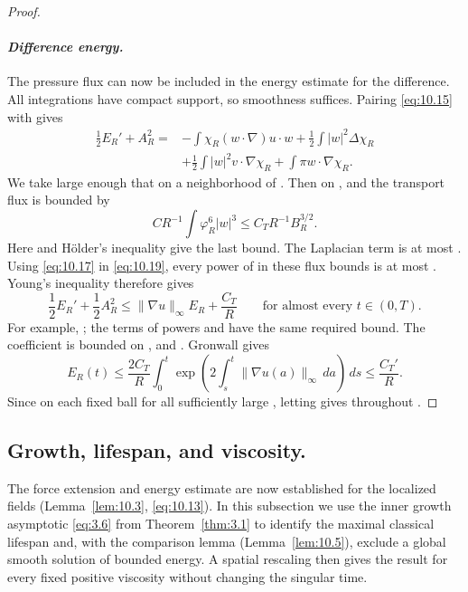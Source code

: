 \begin{proof}
\paragraph{\normalfont\itshape Difference energy.}
The pressure flux can now be included in the energy estimate for the difference. All
integrations have compact support, so smoothness suffices. Pairing \eqref{eq:10.15} with
 gives
\[
\begin{aligned}
  \frac12E_R'+A_R^2
  ={}&-\int\chi_R(w\cdot\nabla)u\cdot w
      +\frac12\int|w|^2\Delta\chi_R\\
     &+\frac12\int|w|^2v\cdot\nabla\chi_R
      +\int\pi w\cdot\nabla\chi_R.
\end{aligned}
\]
We take  large enough that
 on a neighborhood of
. Then
 on ,
and the transport flux is bounded by
\[
  CR^{-1}\int\varphi_R^6|w|^3\leq C_TR^{-1}B_R^{3/2}.
\]
Here
 and
Hölder's inequality give the last bound. The Laplacian term is at most
. Using \eqref{eq:10.17} in \eqref{eq:10.19}, every
power of  in these flux bounds is at most
. Young's inequality therefore gives
\[
  \frac12E_R'+\frac12A_R^2
  \leq\|\nabla u\|_\infty E_R+\frac{C_T}{R}
  \qquad\text{for almost every }t\in(0,T).
\]
For example,
; the terms
of powers  and  have the same
required bound. The coefficient  is bounded
on , and . Gronwall gives
\[
  E_R(t)\leq\frac{2C_T}{R}\int_0^t
  \exp\left(2\int_s^t\|\nabla u(a)\|_\infty\,da\right)\,ds
  \leq\frac{C_T'}{R}.
\]
Since  on each fixed ball for all sufficiently large
, letting  gives
 throughout .
\end{proof}

\subsection{Growth, lifespan, and viscosity.}\label{sec:10.4}
The force extension and energy estimate are now established for the localized fields
 (Lemma~\ref{lem:10.3}, \eqref{eq:10.13}). In this subsection
we use the inner growth asymptotic \eqref{eq:3.6} from Theorem~\ref{thm:3.1} to identify
the maximal classical lifespan and, with the comparison lemma (Lemma~\ref{lem:10.5}),
exclude a global smooth solution of bounded energy. A spatial rescaling then gives the
result for every fixed positive viscosity without changing the singular time.

